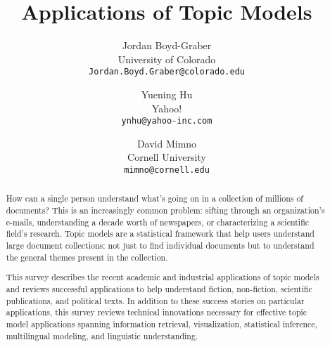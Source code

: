 \documentclass[openany]{now} %
\title{Applications of Topic Models}
\author{
Jordan Boyd-Graber \\
University of Colorado \\
\texttt{Jordan.Boyd.Graber@colorado.edu}
\and
Yuening Hu \\
Yahoo! \\
\texttt{ynhu@yahoo-inc.com}
\and
David Mimno \\
Cornell University \\
\texttt{mimno@cornell.edu}
}
\begin{document}
\copyrightowner{}

\frontmatter  %

\maketitle

\tableofcontents

\mainmatter

\begin{abstract}
  How can a single person understand what's going on in a collection
  of millions of documents?  This is an increasingly common problem:
  sifting through an organization's e-mails, understanding a decade
  worth of newspapers, or characterizing a scientific field's
  research.  Topic models are a statistical framework that help users
  understand large document collections: not just to find individual
  documents but to understand the general themes
  present in the collection.

  This survey describes the recent academic and industrial
  applications of topic models and reviews successful applications to
  help understand fiction, non-fiction, scientific publications, and
  political texts.  In addition to these success stories on particular
  applications, this survey reviews technical innovations necessary
  for effective topic model applications spanning information
  retrieval, visualization, statistical inference, multilingual
  modeling, and linguistic understanding.
\end{abstract}



%









\backmatter  %



\end{document}
